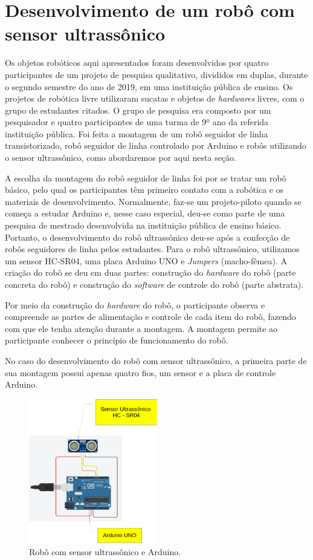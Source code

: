 \documentclass{textolivre}
\begin{document}
\section{Desenvolvimento de um robô com sensor ultrassônico}\label{sec-desenvolvimento}
Os objetos robóticos aqui apresentados foram desenvolvidos por quatro participantes de um projeto de pesquisa qualitativo, divididos em duplas, durante o segundo semestre do ano de 2019, em uma instituição pública de ensino. Os projetos de robótica livre utilizaram sucatas e objetos de \emph{hardwares} livres, com o grupo de estudantes citados. O grupo de pesquisa era composto por um pesquisador e quatro participantes de uma turma de 9º ano da referida instituição pública. Foi feita a montagem de um robô seguidor de linha transistorizado, robô seguidor de linha controlado por Arduino e robôs utilizando o sensor ultrassônico, como abordaremos por aqui nesta seção.

A escolha da montagem do robô seguidor de linha foi por se tratar um robô básico, pelo qual os participantes têm primeiro contato com a robótica e os materiais de desenvolvimento. Normalmente, faz-se  um projeto-piloto quando se começa a estudar Arduino e, nesse caso especial, deu-se como parte de uma pesquisa de mestrado desenvolvida na instituição pública de ensino básico. Portanto, o desenvolvimento do robô ultrassônico deu-se após a confecção de robôs seguidores de linha pelos estudantes. Para o robô ultrassônico, utilizamos um sensor HC-SR04, uma placa Arduino UNO e \emph{Jumpers} (macho-fêmea). A criação do robô se deu em duas partes: construção do \emph{hardware} do robô (parte concreta do robô) e construção do \emph{software} de controle do robô (parte abstrata).

Por meio da construção do \emph{hardware} do robô, o participante observa e compreende as partes de alimentação e controle de cada item do robô, fazendo com que ele tenha atenção durante a montagem. A montagem permite ao participante conhecer o princípio de funcionamento do robô. 

No caso do desenvolvimento do robô com sensor ultrassônico, a primeira parte de sua montagem possui apenas quatro fios, um sensor e a placa de controle Arduino.

\begin{figure}[htbp]
 \centering
 \includegraphics[width=0.5\textwidth]{fig-005.png}
 \caption{Robô com sensor ultrassônico e Arduino.}
 \label{fig5}
\end{figure}
\end{document}

